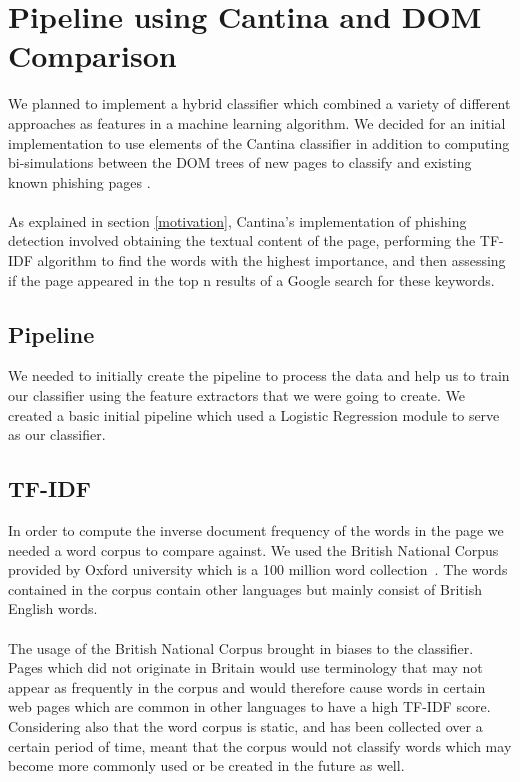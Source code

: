 \documentclass[12pt,twoside]{report}
\begin{document}
\section{Pipeline using Cantina and DOM Comparison}
We planned to implement a hybrid classifier which combined a variety of different approaches as features in a machine learning algorithm. We decided for an initial implementation to use elements of the Cantina classifier in addition to computing bi-simulations between the DOM trees of new pages to classify and existing known phishing pages \cite{cantina}.
\\\\
As explained in section \ref{motivation}, Cantina's implementation of phishing detection involved obtaining the textual content of the page, performing the TF-IDF algorithm to find the words with the highest importance, and then assessing if the page appeared in the top n results of a Google search for these keywords.
\subsection{Pipeline}
We needed to initially create the pipeline to process the data and help us to train our classifier using the feature extractors that we were going to create. We created a basic initial pipeline which used a Logistic Regression module to serve as our classifier.
\subsection{TF-IDF}
In order to compute the inverse document frequency of the words in the page we needed a word corpus to compare against. We used the British National Corpus provided by Oxford university which is a 100 million word collection~\cite{bnc}. The words contained in the corpus contain other languages but mainly consist of British English words.
\\\\
The usage of the British National Corpus brought in biases to the classifier. Pages which did not originate in Britain would use terminology that may not appear as frequently in the corpus and would therefore cause words in certain web pages which are common in other languages to have a high TF-IDF score. Considering also that the word corpus is static, and has been collected over a certain period of time, meant that the corpus would not classify words which may become more commonly used or be created in the future as well. 
\clearpage
\end{document}
